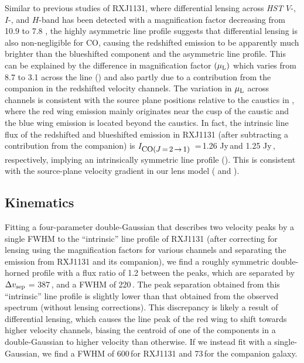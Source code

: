 \documentclass[]{emulateapj}
\begin{document}
Similar to previous studies of RXJ1131, where
differential lensing across {\it HST}
$V$-, $I$-, and $H$-band has been detected with a
magnification factor decreasing from 10.9 to 7.8 ,
the highly asymmetric \bco line profile suggests that
differential lensing is also non-negligible for CO,
causing the redshifted emission to be apparently much brighter than the
blueshifted component and the asymmetric line profile.
This can be explained by the difference in magnification factor $(\mu_{\rm L})$ which
varies from 8.7 to 3.1 across the \bco line () and also partly due to a contribution from the companion in the redshifted velocity channels.
The variation in $\mu_{\rm L}$ across channels is consistent with the source plane
positions relative to the caustics in , where the red wing
emission mainly originates near the cusp
of the caustic and the blue wing emission is located beyond the caustics.
In fact, the intrinsic line flux of the redshifted and
blueshifted emission in RXJ1131 (after subtracting a contribution from the companion)
is $I_{\small \mbox{CO($J$\,=\,2\,$\rightarrow$\,1) }}$\,=\,1.26 Jy\,\kms and 1.25 Jy\,\kms, respectively,
implying an intrinsically symmetric line profile (). This is consistent with the source-plane
velocity gradient in our lens model ( and ).

\subsection{\bco Kinematics}
Fitting a four-parameter double-Gaussian that describes two velocity peaks by a single FWHM
to the ``intrinsic'' \bco line profile of RXJ1131 (after correcting for lensing using
the magnification factors for various channels and separating the emission from RXJ1131 and its companion),
we find a roughly symmetric double-horned profile with a flux ratio of 1.2 between the peaks, which
are separated by
$\Delta v_{\rm sep}$ = 387\,\kms, and a
FWHM of 220\,\kms.
The peak separation obtained from this ``intrinsic'' line profile is 
slightly lower than that obtained from the observed spectrum (\ie without lensing corrections).
This discrepancy is likely a result of differential lensing, which causes the line peak of the red wing 
to shift towards higher velocity channels, biasing the centroid of
one of the components in a double-Gaussian to higher velocity than otherwise.
If we instead fit with a single-Gaussian, we find a FWHM of 600\,\kms for RXJ1131
and 73\,\kms for the companion galaxy.
\end{document}
